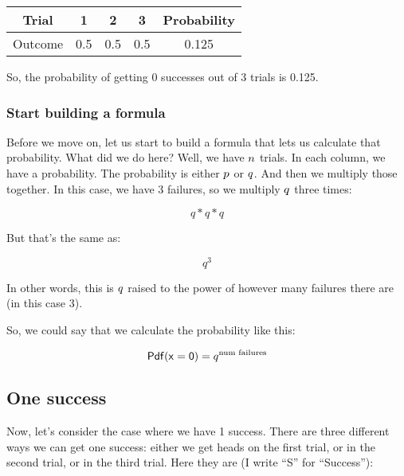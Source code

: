 \documentclass[../../../main.tex]{subfiles}
\begin{document}
\begin{center}
  \begin{tabular}{| c | c | c | c | c |}
    \hline
    \textbf{Trial} & \textbf{1} & \textbf{2} & \textbf{3} & \textbf{Probability} \\ \hline
    Outcome & 0.5 & 0.5 & 0.5 & 0.125 \\ \hline
  \end{tabular}
\end{center}

\noindent
So, the probability of getting 0 successes out of 3 trials is 0.125.


\subsubsection{Start building a formula}

Before we move on, let us start to build a formula that lets us calculate that probability. What did we do here? Well, we have $\numTrials/$ trials. In each column, we have a probability. The probability is either $\success/$ or $\failure/$. And then we multiply those together. In this case, we have 3 failures, so we multiply $\failure/$ three times:

\begin{equation*}
  q * q * q
\end{equation*}

But that's the same as:

\begin{equation*}
  q^{3}
\end{equation*}

In other words, this is $\failure/$ raised to the power of however many failures there are (in this case 3).

So, we could say that we calculate the probability like this:

\begin{equation*}
  \mathsf{Pdf(x = 0)} = q^{\text{num failures}}
\end{equation*}


\subsection{One success}

Now, let's consider the case where we have 1 success. There are three different ways we can get one success: either we get heads on the first trial, or in the second trial, or in the third trial. Here they are (I write ``S'' for ``Success''):
\end{document}
